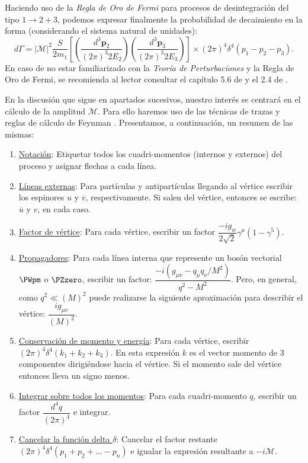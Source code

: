 Haciendo uso de la \textit{Regla de Oro de Fermi} para procesos de desintegración del tipo $1 \rightarrow 2+3$, podemos expresar finalmente la probabilidad de decaimiento en la forma (considerando el sistema natural de unidades):
\begin{equation}
d\Gamma =\left| \mathcal{M}\right| ^{2}\dfrac{S}{2m_{1}}\left[ \left( \dfrac{d^{3}\boldsymbol{p}_{2}}{\left( 2\pi \right) ^{3}2E_{2}}\right) \left( \dfrac{d^{3}\boldsymbol{p}_{3}}{\left( 2\pi \right) ^{3}2E_{3}}\right) \right] \times \left( 2\pi \right) ^{4}\delta ^{4}\left( p_{1}-p_{2}-p_{3}\right).\label{eq:defROF}
\end{equation}
En caso de no estar familiarizado con la \textit{Teoría de Perturbaciones} y la Regla de Oro de Fermi, se recomienda al lector consultar el capítulo 5.6 de \cite{SakuraiQM} y el 2.4 de \cite{SakuraiMCR}.

En la discusión que sigue en apartados sucesivos, nuestro interés se centrará en el cálculo de la amplitud $\mathcal{M}$. Para ello haremos uso de las técnicas de trazas y reglas de cálculo de Feynman \cite{Griffiths2008}. Presentamos, a continuación, un resumen de las mismas:

\begin{enumerate}
\item \underline{Notación}: Etiquetar todos los cuadri-momentos (internos y externos) del proceso y asignar flechas a cada línea.
\item \underline{Líneas externas}: Para partículas y antipartículas llegando al vértice escribir los espinores $u$ y $\overline{v}$, respectivamente. Si salen del vértice, entonces se escribe: $\overline{u}$ y $v$, en cada caso.
\item \underline{Factor de vértice}: Para cada vértice, escribir un factor $\dfrac{-ig_{w}}{2\sqrt{2}}\gamma ^{\mu }\left( 1-\gamma ^{5}\right)$. 
\item \underline{Propagadores}: Para cada línea interna que represente un bosón vectorial $\PWpm$ o $\PZzero$, escribir un factor: 
$\dfrac{-i\left( g_{\mu\nu }-q_{\mu }q_{\nu }/M^{2}\right) }{q^{2}-M^{2}}$. Pero, en general, como $q^{2}\ll \left( M\right)^{2}$ puede realizarse la siguiente aproximación para describir el vértice: $\dfrac{ig_{\mu \nu }}{\left( M\right) ^{2}}$.
\item \underline{Conservación de momento y energía}: Para cada vértice, escribir $\left( 2\pi \right) ^{4}\delta ^{4}\left( k_{1}+k_{2}+k_{3}\right)$. En esta expresión $k$ es el vector momento de 3 componentes dirigiéndose hacia el vértice. Si el momento sale del vértice entonces lleva un signo menos.
\item \underline{Integrar sobre todos los momentos}: Para cada cuadri-momento $q$, escribir un factor $\dfrac{d^{4}q}{\left( 2\pi \right) ^{4}}$ e integrar.
\item \underline{Cancelar la función delta $\delta$}: Cancelar el factor restante $\left( 2\pi \right) ^{4}\delta ^{4}\left( p_{1}+p_{2}+\ldots -p_{n}\right)$ e igualar la expresión resultante a $-i\mathcal{M}$.
\end{enumerate}


